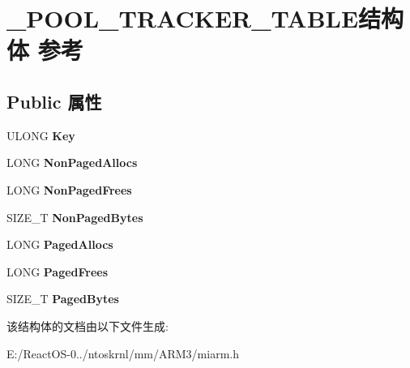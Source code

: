 \hypertarget{struct___p_o_o_l___t_r_a_c_k_e_r___t_a_b_l_e}{}\section{\+\_\+\+P\+O\+O\+L\+\_\+\+T\+R\+A\+C\+K\+E\+R\+\_\+\+T\+A\+B\+L\+E结构体 参考}
\label{struct___p_o_o_l___t_r_a_c_k_e_r___t_a_b_l_e}
\subsection*{Public 属性}
\begin{DoxyCompactItemize}
\item 
\mbox{\label{struct___p_o_o_l___t_r_a_c_k_e_r___t_a_b_l_e_a19a79f998c436d99013dab49a86b7a9b}} 
U\+L\+O\+NG {\bfseries Key}
\item 
\mbox{\label{struct___p_o_o_l___t_r_a_c_k_e_r___t_a_b_l_e_a20a5084d046cbac7d47258ba9c9987a8}} 
L\+O\+NG {\bfseries Non\+Paged\+Allocs}
\item 
\mbox{\label{struct___p_o_o_l___t_r_a_c_k_e_r___t_a_b_l_e_a5d5350f7bcabc36d045b6fc7b275cc61}} 
L\+O\+NG {\bfseries Non\+Paged\+Frees}
\item 
\mbox{\label{struct___p_o_o_l___t_r_a_c_k_e_r___t_a_b_l_e_a30fd228cbade101e171495ea36e390bc}} 
S\+I\+Z\+E\+\_\+T {\bfseries Non\+Paged\+Bytes}
\item 
\mbox{\label{struct___p_o_o_l___t_r_a_c_k_e_r___t_a_b_l_e_a9b69d51190fa4e82452dbaec00c3671a}} 
L\+O\+NG {\bfseries Paged\+Allocs}
\item 
\mbox{\label{struct___p_o_o_l___t_r_a_c_k_e_r___t_a_b_l_e_abc1e5723b958aac01f5dc2302982b673}} 
L\+O\+NG {\bfseries Paged\+Frees}
\item 
\mbox{\label{struct___p_o_o_l___t_r_a_c_k_e_r___t_a_b_l_e_aa5bb886b65be18f0f4d311a3972a9a7f}} 
S\+I\+Z\+E\+\_\+T {\bfseries Paged\+Bytes}
\end{DoxyCompactItemize}


该结构体的文档由以下文件生成\+:\begin{DoxyCompactItemize}
\item 
E\+:/\+React\+O\+S-\/0../ntoskrnl/mm/\+A\+R\+M3/miarm.\+h\end{DoxyCompactItemize}
